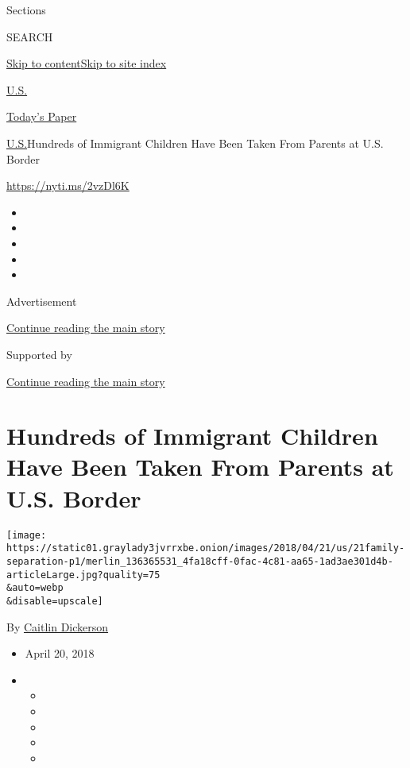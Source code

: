 Sections

SEARCH

\protect\hyperlink{site-content}{Skip to
content}\protect\hyperlink{site-index}{Skip to site index}

\href{https://www.nytimes3xbfgragh.onion/section/us}{U.S.}

\href{https://myaccount.nytimes3xbfgragh.onion/auth/login?response_type=cookie\&client_id=vi}{}

\href{https://www.nytimes3xbfgragh.onion/section/todayspaper}{Today's
Paper}

\href{/section/us}{U.S.}\textbar{}Hundreds of Immigrant Children Have
Been Taken From Parents at U.S. Border

\url{https://nyti.ms/2vzDl6K}

\begin{itemize}
\item
\item
\item
\item
\item
\end{itemize}

Advertisement

\protect\hyperlink{after-top}{Continue reading the main story}

Supported by

\protect\hyperlink{after-sponsor}{Continue reading the main story}

\hypertarget{hundreds-of-immigrant-children-have-been-taken-from-parents-at-us-border}{%
\section{Hundreds of Immigrant Children Have Been Taken From Parents at
U.S.
Border}\label{hundreds-of-immigrant-children-have-been-taken-from-parents-at-us-border}}

\texttt{[image: https://static01.graylady3jvrrxbe.onion/images/2018/04/21/us/21family-separation-p1/merlin\_136365531\_4fa18cff-0fac-4c81-aa65-1ad3ae301d4b-articleLarge.jpg?quality=75\\\&auto=webp\\\&disable=upscale]}

By
\href{https://www.nytimes3xbfgragh.onion/by/caitlin-dickerson}{Caitlin
Dickerson}

\begin{itemize}
\item
  April 20, 2018
\item
  \begin{itemize}
  \item
  \item
  \item
  \item
  \item
  \end{itemize}
\end{itemize}

